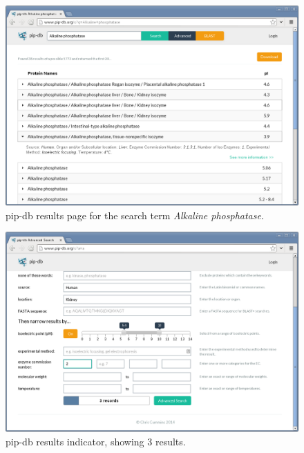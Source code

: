 \begin{figure}[H]
\centering
    \includegraphics[width=\textwidth]{assets/pip-db-results}
\caption[pip-db results page]
        {pip-db results page for the search term \textit{Alkaline phosphatase}.}
\label{fig:pip-db-results}
\end{figure}


\begin{figure}[H]
\centering
    \includegraphics[width=\textwidth]{assets/pip-db-results-indicator}
\caption[pip-db results indicator]
        {pip-db results indicator, showing 3 results.}
\label{fig:pip-db-results-indicator}
\end{figure}
